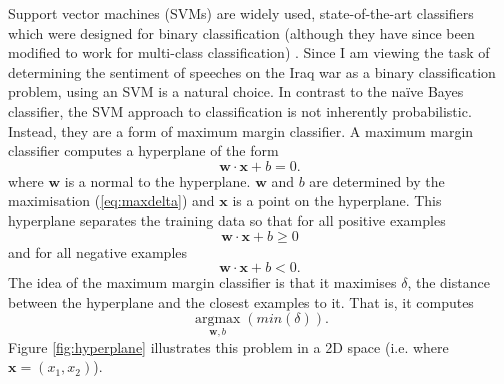 \documentclass[12pt,a4paper,twoside,openright]{report}
\begin{document}
Support vector machines (SVMs) are widely used, state-of-the-art classifiers which were designed for binary classification (although they have since been modified to work for multi-class classification) \cite{ml_book}. Since I am viewing the task of determining the sentiment of speeches on the Iraq war as a binary classification problem, using an SVM is a natural choice.
\newline
\newline
In contrast to the na\"{i}ve Bayes classifier, the SVM approach to classification is not inherently probabilistic. Instead, they are a form of maximum margin classifier. A maximum margin classifier computes a hyperplane of the form
\begin{equation} \label{eq:hyperplane}
	\mathbf{w} \cdot \mathbf{x} + b = 0.
\end{equation}
where $\mathbf{w}$ is a normal to the hyperplane. $\mathbf{w}$ and $b$ are determined by the maximisation (\ref{eq:maxdelta}) and $\mathbf{x}$ is a point on the hyperplane. This hyperplane separates the training data so that for all positive examples
\begin{equation}
\mathbf{w} \cdot \mathbf{x} + b \ge 0
\end{equation}
and for all negative examples
\begin{equation}
\mathbf{w} \cdot \mathbf{x} + b < 0.
\end{equation}
The idea of the maximum margin classifier is that it maximises $\delta$, the distance between the hyperplane and the closest examples to it. That is, it computes
\begin{equation} \label{eq:maxdelta}
	\underset{\mathbf{w}, b}{\operatorname{argmax}}(min(\delta)).
\end{equation}
Figure \ref{fig:hyperplane} illustrates this problem in a 2D space (i.e. where $\mathbf{x} = (x_1, x_2)$).
\end{document}
